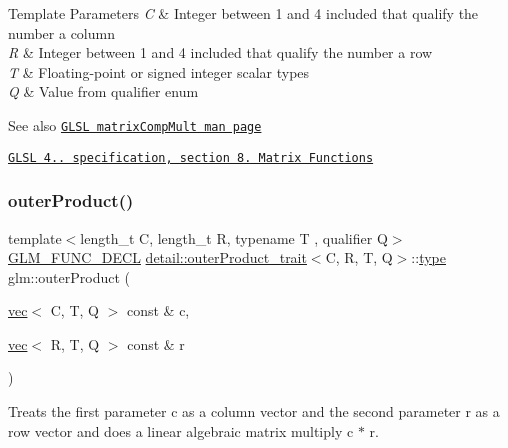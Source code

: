\begin{DoxyTemplParams}{Template Parameters}
{\em C} & Integer between 1 and 4 included that qualify the number a column \\
\hline
{\em R} & Integer between 1 and 4 included that qualify the number a row \\
\hline
{\em T} & Floating-\/point or signed integer scalar types \\
\hline
{\em Q} & Value from qualifier enum\\
\hline
\end{DoxyTemplParams}
\begin{DoxySeeAlso}{See also}
\href{http://www.opengl.org/sdk/docs/manglsl/xhtml/matrixCompMult.xml}{\tt G\+L\+SL matrix\+Comp\+Mult man page} 

\href{http://www.opengl.org/registry/doc/GLSLangSpec.4.20.8.pdf}{\tt G\+L\+SL 4.. specification, section 8. Matrix Functions} 
\end{DoxySeeAlso}
\mbox{\label{group__core__func__matrix_gac29fb7bae75a8e4c1b74cbbf85520e50}} 
\subsubsection{\texorpdfstring{outer\+Product()}{outerProduct()}}
{\footnotesize\ttfamily template$<$length\+\_\+t C, length\+\_\+t R, typename T , qualifier Q$>$ \\
\mbox{\hyperlink{setup_8hpp_ab2d052de21a70539923e9bcbf6e83a51}{G\+L\+M\+\_\+\+F\+U\+N\+C\+\_\+\+D\+E\+CL}} \mbox{\hyperlink{structglm_1_1detail_1_1outer_product__trait}{detail\+::outer\+Product\+\_\+trait}}$<$C, R, T, Q$>$\+::\mbox{\hyperlink{structglm_1_1type}{type}} glm\+::outer\+Product (\begin{DoxyParamCaption}\item[{\mbox{\hyperlink{structglm_1_1vec}{vec}}$<$ C, T, Q $>$ const \&}]{c,  }\item[{\mbox{\hyperlink{structglm_1_1vec}{vec}}$<$ R, T, Q $>$ const \&}]{r }\end{DoxyParamCaption})}

Treats the first parameter c as a column vector and the second parameter r as a row vector and does a linear algebraic matrix multiply c $\ast$ r.


